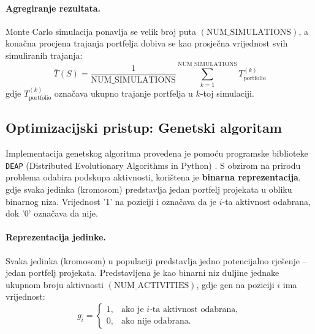 \paragraph{Agregiranje rezultata.}
Monte Carlo simulacija ponavlja se velik broj puta $(\text{NUM\_SIMULATIONS})$, a konačna procjena trajanja portfelja 
dobiva se kao prosječna vrijednost svih simuliranih trajanja:
\[
\overline{T}(S) = \frac{1}{\text{NUM\_SIMULATIONS}} \sum_{k=1}^{\text{NUM\_SIMULATIONS}} T_{\text{portfolio}}^{(k)}
\]
gdje $T_{\text{portfolio}}^{(k)}$ označava ukupno trajanje portfelja u $k$-toj simulaciji.


\subsection{Optimizacijski pristup: Genetski algoritam}

Implementacija genetskog algoritma provedena je pomoću programske biblioteke \texttt{DEAP} (Distributed Evolutionary Algorithms in Python) \cite{DEAP2012}. 
S obzirom na prirodu problema odabira podskupa aktivnosti, korištena je \textbf{binarna reprezentacija}, gdje svaka jedinka (kromosom) predstavlja jedan portfelj projekata u obliku binarnog niza. Vrijednost '1' na poziciji i označava da je $i$-ta aktivnost odabrana, dok '0' označava da nije.
\paragraph{Reprezentacija jedinke.}
Svaka jedinka (kromosom) u populaciji predstavlja jedno potencijalno rješenje – jedan portfelj projekata. 
Predstavljena je kao binarni niz duljine jednake ukupnom broju aktivnosti $(\text{NUM\_ACTIVITIES})$, gdje gen na poziciji $i$ ima vrijednost:
\[
g_i =
\begin{cases}
1, & \text{ako je $i$-ta aktivnost odabrana}, \\
0, & \text{ako nije odabrana}.
\end{cases}
\]

